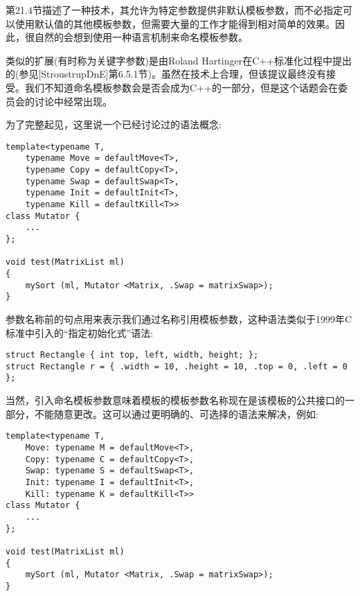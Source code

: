 第21.4节描述了一种技术，其允许为特定参数提供非默认模板参数，而不必指定可以使用默认值的其他模板参数，但需要大量的工作才能得到相对简单的效果。因此，很自然的会想到使用一种语言机制来命名模板参数。

类似的扩展(有时称为关键字参数)是由Roland Hartinger在C++标准化过程中提出的(参见[StroustrupDnE]第6.5.1节)。虽然在技术上合理，但该提议最终没有接受。我们不知道命名模板参数会是否会成为C++的一部分，但是这个话题会在委员会的讨论中经常出现。

为了完整起见，这里说一个已经讨论过的语法概念:

\begin{lstlisting}[style=styleCXX]
template<typename T,
	typename Move = defaultMove<T>,
	typename Copy = defaultCopy<T>,
	typename Swap = defaultSwap<T>,
	typename Init = defaultInit<T>,
	typename Kill = defaultKill<T>>
class Mutator {
	...
};

void test(MatrixList ml)
{
	mySort (ml, Mutator <Matrix, .Swap = matrixSwap>);
}
\end{lstlisting}

参数名称前的句点用来表示我们通过名称引用模板参数，这种语法类似于1999年C标准中引入的“指定初始化式”语法:

\begin{lstlisting}[style=styleCXX]
struct Rectangle { int top, left, width, height; };
struct Rectangle r = { .width = 10, .height = 10, .top = 0, .left = 0 };
\end{lstlisting}

当然，引入命名模板参数意味着模板的模板参数名称现在是该模板的公共接口的一部分，不能随意更改。这可以通过更明确的、可选择的语法来解决，例如:

\begin{lstlisting}[style=styleCXX]
template<typename T,
	Move: typename M = defaultMove<T>,
	Copy: typename C = defaultCopy<T>,
	Swap: typename S = defaultSwap<T>,
	Init: typename I = defaultInit<T>,
	Kill: typename K = defaultKill<T>>
class Mutator {
	...
};

void test(MatrixList ml)
{
	mySort (ml, Mutator <Matrix, .Swap = matrixSwap>);
}
\end{lstlisting}









































